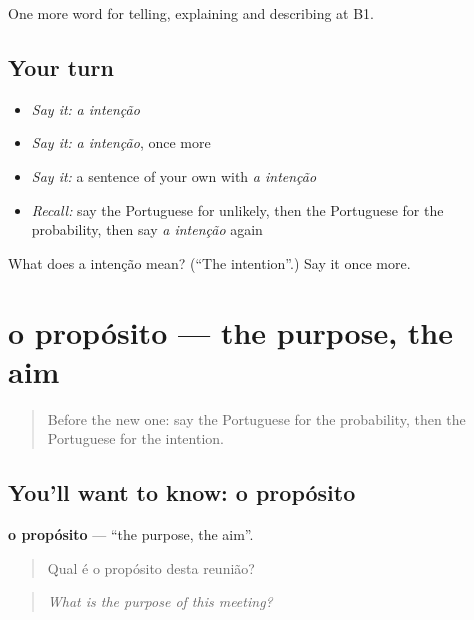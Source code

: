 \begin{grammarlens}[title={What you've built}]
One more word for telling, explaining and describing at B1.
\end{grammarlens}

\subsection*{Your turn}
\begin{itemize}
\raggedright
  \item \emph{Say it:} \emph{a intenção}
  \item \emph{Say it:} \emph{a intenção}, once more
  \item \emph{Say it:} a sentence of your own with \emph{a intenção}
  \item \emph{Recall:} say the Portuguese for unlikely, then the Portuguese for the probability, then say \emph{a intenção} again
\end{itemize}

\begin{tcolorbox}[breakable,colback=teal!4,colframe=teal!35!black,title={Before you move on}]
What does a intenção mean? (\textquotedblleft{}The intention\textquotedblright{}.) Say it once more.
\end{tcolorbox}
\section[o propósito]{o propósito — the purpose, the aim}

\label{lesson:PT-C374-proposito}



\begin{quote}
Before the new one: say the Portuguese for the probability, then the Portuguese for the intention.
\end{quote}

\subsection*{You'll want to know: o propósito}
\textbf{o propósito} — \textquotedblleft{}the purpose, the aim\textquotedblright{}.

\begin{quote}
Qual é o propósito desta reunião?
\end{quote}

\begin{quote}
\emph{What is the purpose of this meeting?}
\end{quote}

